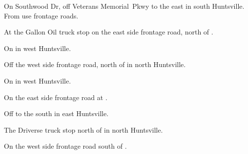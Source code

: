 
\begin{LocationList}

On Southwood Dr, off  Veterans Memorial~Pkwy to the east in south Huntsville.
From  use frontage roads.

At the Gallon Oil truck stop on the east side  frontage road, north of .

On   in west Huntsville.

Off the west side  frontage road, north of  in north Huntsville.

\Location{\RecruitmentAgency \Recruitment}
On   in west Huntsville.

On the east side  frontage road at .

Off  to the south in east Huntsville.

\Location{\TruckStop \Gas \Rest \Service \Weigh}
The Driverse truck stop north of  in north Huntsville.

On the west side  frontage road south of  .

\end{LocationList}
